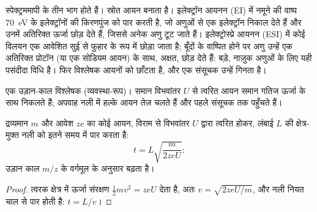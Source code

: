 स्पेक्ट्रममापी के तीन भाग होते हैं। स्रोत आयन बनाता है। इलेक्ट्रॉन आयनन (EI) में नमूने की वाष्प
\qty{70}{eV} के इलेक्ट्रॉनों की किरणपुंज को पार करती है, जो अणुओं से एक इलेक्ट्रॉन निकाल देते हैं और
उनमें अतिरिक्त ऊर्जा छोड़ देते हैं, जिससे अनेक अणु टूट जाते हैं। इलेक्ट्रोस्प्रे आयनन (ESI) में कोई विलयन
एक आवेशित सुई से फुहार के रूप में छोड़ा जाता है; बूँदों के वाष्पित होने पर अणु उन्हें एक अतिरिक्त प्रोटॉन
(या एक सोडियम आयन) के साथ, अक्षत, छोड़ देते हैं: बड़े, नाज़ुक अणुओं के लिए यही पसंदीदा विधि है। फिर विश्लेषक
आयनों को छाँटता है, और एक संसूचक उन्हें गिनता है।

\begin{omfigure}
\par\vspace{4pt}

{\small एक उड़ान-काल विश्लेषक (व्यवस्था-रूप)। समान विभवांतर
$U$ से त्वरित आयन समान गतिज ऊर्जा के साथ निकलते हैं; अपवाह नली में हल्के आयन तेज़ चलते हैं और पहले
संसूचक तक पहुँचते हैं।}
\end{omfigure}

\begin{proposition}[उड़ान काल]\label{prop:b2:mass-spec-atomic:time-of-flight}
द्रव्यमान $m$ और आवेश $ze$ का कोई आयन, विराम से विभवांतर $U$ द्वारा त्वरित होकर,
लंबाई $L$ की क्षेत्र-मुक्त नली को इतने समय में पार करता है:
\begin{equation*}
t = L\sqrt{\frac{m}{2zeU}}:
\end{equation*}
उड़ान काल $m/z$ के वर्गमूल के अनुसार बढ़ता है।
\end{proposition}

\begin{proof}
त्वरक क्षेत्र में ऊर्जा संरक्षण $\tfrac12mv^2 = zeU$ देता है, अतः $v = \sqrt{2zeU/m}$, और
नली नियत चाल से पार होती है: $t = L/v$।
\end{proof}


